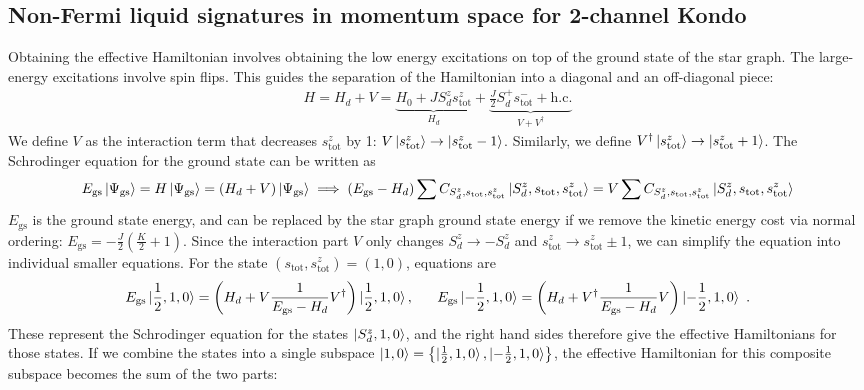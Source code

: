 \documentclass[reprint,onecolumn,prb,superscriptaddress]{revtex4-2}
\begin{document}
\subsection{Non-Fermi liquid signatures in momentum space for 2-channel Kondo}
Obtaining the effective Hamiltonian involves obtaining the low energy excitations on top of the ground state of the star graph. The large-energy excitations involve spin flips. This guides the separation of the Hamiltonian into a diagonal and an off-diagonal piece:
\begin{align}
	H = H_d + V = \underbrace{H_0 + J S_d^z s_\text{tot}^z}_{H_d} + \underbrace{\frac{J}{2}S_d^+ s_\text{tot}^- + \text{h.c.}}_{V + V^\dagger}
\end{align}
We define \(V\) as the interaction term that decreases \(s_\text{tot}^z\) by 1: \(V \ket{s_\text{tot}^z} \to \ket{s_\text{tot}^z - 1}\). Similarly, we define \(V^\dagger \ket{s_\text{tot}^z} \to \ket{s_\text{tot}^z + 1}\). The Schrodinger equation for the ground state can be written as
\begin{align}
	E_\text{gs}\ket{\Psi_\text{gs}} = H \ket{\Psi_\text{gs}} = \left(H_d + V\right)\ket{\Psi_\text{gs}} \implies \left(E_\text{gs} - H_d\right)\sum C_{S_d^z, s_\text{tot},s_\text{tot}^z}\ket{S_d^z, s_\text{tot}, s_\text{tot}^z} = V\sum C_{S_d^z, s_\text{tot},s_\text{tot}^z}\ket{S_d^z, s_\text{tot}, s_\text{tot}^z}
\end{align}
\(E_\text{gs}\) is the ground state energy, and can be replaced by the star graph ground state energy if we remove the kinetic energy cost via normal ordering: \(E_\text{gs} = -\frac{J}{2}\left(\frac{K}{2}+1\right) \). Since the interaction part \(V\) only changes \(S_d^z \to -S_d^z\) and \(s^z_\text{tot} \to s^z_\text{tot} \pm 1\), we can simplify the equation into individual smaller equations. For the state \((s_\text{tot},s^z_\text{tot}) = (1,0)\), equations are
\begin{equation}
	\label{eff_ham_Sdz_10}
	E_\text{gs} \ket{\frac{1}{2}, 1, 0} = \left(H_d + V \frac{1}{E_\text{gs} - H_d}V^\dagger\right) \ket{\frac{1}{2}, 1, 0}, ~ ~ ~ ~ ~ E_\text{gs} \ket{-\frac{1}{2}, 1, 0} = \left(H_d + V^\dagger \frac{1}{E_\text{gs} - H_d} V\right) \ket{-\frac{1}{2}, 1, 0}~.\\
\end{equation}
These represent the Schrodinger equation for the states \(\ket{S_d^z, 1, 0}\), and the right hand sides therefore give the effective Hamiltonians for those states. If we combine the states into a single subspace \(\ket{1,0}= \left\{\ket{\frac{1}{2}, 1, 0}, \ket{-\frac{1}{2}, 1, 0}\right\}\), the effective Hamiltonian for this composite subspace becomes the sum of the two parts:
\end{document}
